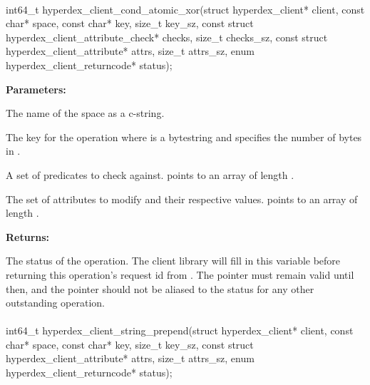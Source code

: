 \paragraph{}
\label{api:c:cond_atomic_xor}
\begin{ccode}
int64_t hyperdex_client_cond_atomic_xor(struct hyperdex_client* client,
        const char* space,
        const char* key, size_t key_sz,
        const struct hyperdex_client_attribute_check* checks, size_t checks_sz,
        const struct hyperdex_client_attribute* attrs, size_t attrs_sz,
        enum hyperdex_client_returncode* status);
\end{ccode}
\funcdesc 

\noindent\textbf{Parameters:}
\begin{description}[labelindent=\widthof{{\code{checks}, \code{checks\_sz}}},leftmargin=*,noitemsep,nolistsep,align=right]
\item[\code{space}] The name of the space as a c-string.
\item[\code{key}, \code{key\_sz}] The key for the operation where  is a bytestring and  specifies the number of bytes in .
\item[\code{checks}, \code{checks\_sz}] A set of predicates to check against.   points to an array of length .
\item[\code{attrs}, \code{attrs\_sz}] The set of attributes to modify and their respective values.   points to an array of length .
\end{description}

\noindent\textbf{Returns:}
\begin{description}[labelindent=\widthof{{\code{status}}},leftmargin=*,noitemsep,nolistsep,align=right]
\item[\code{status}] The status of the operation.  The client library will fill in this variable before returning this operation's request id from .  The pointer must remain valid until then, and the pointer should not be aliased to the status for any other outstanding operation.
\end{description}

\paragraph{}
\label{api:c:string_prepend}
\begin{ccode}
int64_t hyperdex_client_string_prepend(struct hyperdex_client* client,
        const char* space,
        const char* key, size_t key_sz,
        const struct hyperdex_client_attribute* attrs, size_t attrs_sz,
        enum hyperdex_client_returncode* status);
\end{ccode}
\funcdesc 

